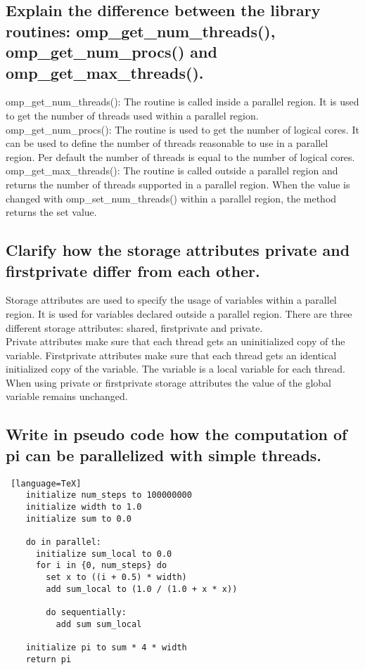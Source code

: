 \documentclass[runningheads]{llncs}
\begin{document}
\subsection{Explain the difference between the library routines: omp\_get\_num\_threads(), omp\_get\_num\_procs() and omp\_get\_max\_threads().}
omp\_get\_num\_threads():
The routine is called inside a parallel region. 
It is used to get the number of threads used within a parallel region.
\\
omp\_get\_num\_procs():
The routine is used to get the number of logical cores. 
It can be used to define the number of threads reasonable to use in a parallel region. 
Per default the number of threads is equal to the number of logical cores.
\\
omp\_get\_max\_threads():
The routine is called outside a parallel region and returns the number of threads supported in a parallel region. 
When the value is changed with omp\_set\_num\_threads() within a parallel region, the method returns the set value.


\subsection{Clarify how the storage attributes private and firstprivate differ from each other.}
Storage attributes are used to specify the usage of variables within a parallel region. 
It is used for variables declared outside a parallel region.
There are three different storage attributes: shared, firstprivate and private.
\\
Private attributes make sure that each thread gets an uninitialized copy of the variable.
Firstprivate attributes make sure that each thread gets an identical initialized copy of the variable. 
The variable is a local variable for each thread.
When using private or firstprivate storage attributes the value of the global variable remains unchanged.

\subsection{Write in pseudo code how the computation of pi can be parallelized with simple threads.}
\begin{lstlisting} [language=TeX]
	initialize num_steps to 100000000
	initialize width to 1.0
	initialize sum to 0.0

	do in parallel:
	  initialize sum_local to 0.0
	  for i in {0, num_steps} do
	    set x to ((i + 0.5) * width)
		add sum_local to (1.0 / (1.0 + x * x))
		
		do sequentially:
		  add sum sum_local
	
	initialize pi to sum * 4 * width
	return pi


\end{lstlisting}
\end{document}
